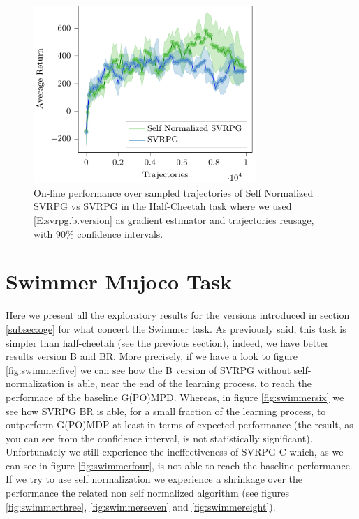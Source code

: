 \begin{figure}[h]
	\begin{minipage}[h]{1\textwidth}
		\centering
		\includegraphics[width=0.75\textwidth]{Images/Experiments/half_cheetah_SVRPG_vs_SN_SVRPG_B_reuse.pdf}
		\vspace{-0.1in}
		\caption{On-line performance over sampled trajectories of Self Normalized \acs{SVRPG} vs \acs{SVRPG} in the Half-Cheetah task where we used \ref{E:svrpg.b.version} as gradient estimator and trajectories reusage, with 90\% confidence intervals.}
		\label{fig:hceleven}
	\end{minipage}
	\vspace{-0.15in}
\end{figure}

\clearpage
\section{Swimmer Mujoco Task}
\vspace{-0.05in}
Here we present all the exploratory results for the versions introduced in section \ref{subsec:oge} for what concert the Swimmer task. As previously said, this task is simpler than half-cheetah (see the previous section), indeed, we have better results \wrt version B and BR. More precisely, if we have a look to figure \ref{fig:swimmerfive} we can see how the B version of \acs{SVRPG} without self-normalization is able, near the end of the learning process, to reach the performace of the baseline G(PO)MPD. Whereas, in figure \ref{fig:swimmersix} we see how \acs{SVRPG} BR is able, for a small fraction of the learning process, to outperform G(PO)MDP at least in terms of expected performance (the result, as you can see from the confidence interval, is not statistically significant). Unfortunately we still experience the ineffectiveness of \acs{SVRPG} C which, as we can see in figure \ref{fig:swimmerfour}, is not able to reach the baseline performance. If we try to use self normalization we experience a shrinkage over the performance \wrt the related non self normalized algorithm (see figures \ref{fig:swimmerthree}, \ref{fig:swimmerseven} and \ref{fig:swimmereight}).

